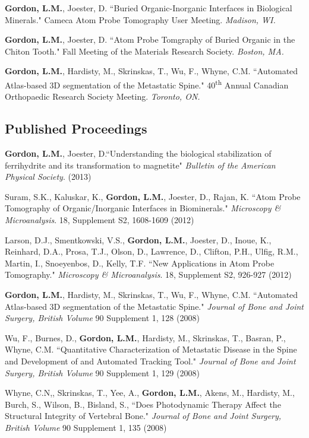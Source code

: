 \textbf{Gordon, L.M.}, Joester, D. ``Buried Organic-Inorganic Interfaces in Biological Minerals." Cameca Atom Probe Tomography User Meeting. \emph{Madison, WI.}

\textbf{Gordon, L.M.}, Joester, D. ``Atom Probe Tomgraphy of Buried Organic in the Chiton Tooth." Fall Meeting of the Materials Research Society. \emph{Boston, MA.}

\textbf{Gordon, L.M.}, Hardisty, M., Skrinskas, T., Wu, F., Whyne, C.M. ``Automated Atlas-based 3D segmentation of the Metastatic Spine." 40\textsuperscript{th} Annual Canadian Orthopaedic Research Society Meeting. \emph{Toronto, ON.}
\endgroup

\subsection*{Published Proceedings}
\textbf{Gordon, L.M.}, Joester, D.``Understanding the biological stabilization of ferrihydrite and its transformation to magnetite" \emph{Bulletin of the American Physical Society}. (2013)

\begingroup\setlength{\parskip}{0.15cm}
Suram, S.K., Kaluskar, K., \textbf{Gordon, L.M.}, Joester, D., Rajan, K. ``Atom Probe Tomography of Organic/Inorganic Interfaces in Biominerals." \emph{Microscopy \& Microanalysis}. 18, Supplement S2, 1608-1609 (2012)

Larson, D.J., Smentkowski, V.S., \textbf{Gordon, L.M.}, Joester, D., Inoue, K.,  Reinhard, D.A., Prosa, T.J., Olson, D., Lawrence, D., Clifton, P.H., Ulfig, R.M., Martin, I., Snoeyenbos, D., Kelly, T.F. ``New Applications in Atom Probe Tomography." \emph{Microscopy \& Microanalysis}. 18, Supplement S2, 926-927 (2012)

\textbf{Gordon, L.M.}, Hardisty, M., Skrinskas, T., Wu, F., Whyne, C.M. ``Automated Atlas-based 3D segmentation of the Metastatic Spine." \emph{Journal of Bone and Joint Surgery, British Volume} 90 Supplement 1, 128 (2008)

Wu, F., Burnes, D., \textbf{Gordon, L.M.}, Hardisty, M., Skrinskas, T., Basran, P., Whyne, C.M. ``Quantitative Characterization of Metastatic Disease in the Spine and Development of and Automated Tracking Tool."  \emph{Journal of Bone and Joint Surgery, British Volume} 90 Supplement 1, 129 (2008)

Whyne, C.N,, Skrinskas, T., Yee, A., \textbf{Gordon, L.M.}, Akens, M., Hardisty, M., Burch, S., Wilson, B., Bisland, S., ``Does Photodynamic Therapy Affect the Structural Integrity of Vertebral Bone." \emph{Journal of Bone and Joint Surgery, British Volume} 90 Supplement 1, 135 (2008)

